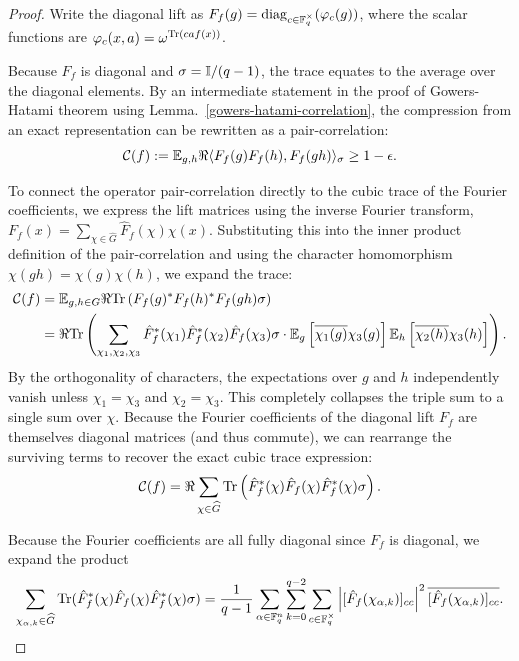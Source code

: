 \begin{proof}\leanok
Write the diagonal lift as $F_f(g) = \operatorname{diag}_{c \in \mathbb{F}_q^\times}(\varphi_c(g))$, where the scalar functions are $\varphi_c(x,a) = \omega^{{\rm Tr}(caf(x))}$. 

Because $F_f$ is diagonal and $\sigma = \mathbb{I}/(q-1)$, the trace equates to the average over the diagonal elements. 
By an intermediate statement in the proof of Gowers-Hatami theorem using Lemma.~\ref{gowers-hatami-correlation}, the compression from an exact representation can be rewritten as a pair-correlation:
\begin{equation}
    \mathcal{C}(f) := \mathbb{E}_{g,h} \Re \langle F_f(g) F_f(h), F_f(gh) \rangle_\sigma \ge 1 - \epsilon. \label{eq:gh-pair-correlation}
\end{equation}


To connect the operator pair-correlation directly to the cubic trace of the Fourier coefficients, we express the lift matrices using the inverse Fourier transform, $F_f(x) = \sum_{\chi \in \widehat{G}} \hat{F}_f(\chi) \chi(x)$. Substituting this into the inner product definition of the pair-correlation and using the character homomorphism $\chi(gh) = \chi(g)\chi(h)$, we expand the trace:
\begin{align}
    \mathcal{C}(f) &= \mathbb{E}_{g,h \in G} \Re {\rm Tr}\left( F_f(g)^* F_f(h)^* F_f(gh) \sigma \right) \nonumber \\
    &= \Re {\rm Tr} \left( \sum_{\chi_1, \chi_2, \chi_3} \hat{F}_f^*(\chi_1) \hat{F}_f^*(\chi_2) \hat{F}_f(\chi_3) \sigma \cdot \mathbb{E}_g\left[\overline{\chi_1(g)}\chi_3(g)\right] \mathbb{E}_h\left[\overline{\chi_2(h)}\chi_3(h)\right] \right).
\end{align}
By the orthogonality of characters, the expectations over $g$ and $h$ independently vanish unless $\chi_1 = \chi_3$ and $\chi_2 = \chi_3$. This completely collapses the triple sum to a single sum over $\chi$. Because the Fourier coefficients of the diagonal lift $F_f$ are themselves diagonal matrices (and thus commute), we can rearrange the surviving terms to recover the exact cubic trace expression:
\begin{equation}
    \mathcal{C}(f) = \Re \sum_{\chi \in \widehat{G}} {\rm Tr}\left( \hat{F}_f^*(\chi) \hat{F}_f(\chi) \hat{F}_f^*(\chi) \sigma \right).
\end{equation}

    Because the Fourier coefficients are all fully diagonal since $F_f$ is diagonal, we expand the product
    \[
    \sum_{\chi_{\alpha, k} \in \widehat{G}} {\rm Tr}(\hat{F}_f^*(\chi)\hat{F}_f(\chi)\hat{F}_f^*(\chi) \sigma) = \frac{1}{q-1}\sum_{\alpha \in \mathbb{F}_q^n} \sum_{k=0}^{q-2} \sum_{c \in \mathbb{F}_q^\times} \left| [\hat{F}_f(\chi_{\alpha, k})]_{cc} \right|^2 \overline{[\hat{F}_f(\chi_{\alpha, k})]_{cc}}.
    \]


\end{proof}
